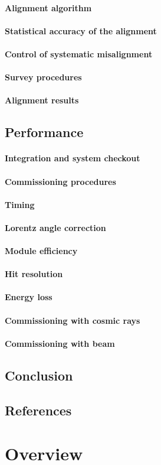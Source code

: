\paragraph{Alignment algorithm}
\paragraph{Statistical accuracy of the alignment}
\paragraph{Control of systematic misalignment}
\paragraph{Survey procedures}
\paragraph{Alignment results}
\subsection{Performance}
\paragraph{Integration and system checkout}
\paragraph{Commissioning procedures}
\paragraph{Timing}
\paragraph{Lorentz angle correction}
\paragraph{Module efficiency}
\paragraph{Hit resolution}
\paragraph{Energy loss}
\paragraph{Commissioning with cosmic rays}
\paragraph{Commissioning with beam}
\subsection{Conclusion}
\subsection{References}

\section{Overview}

